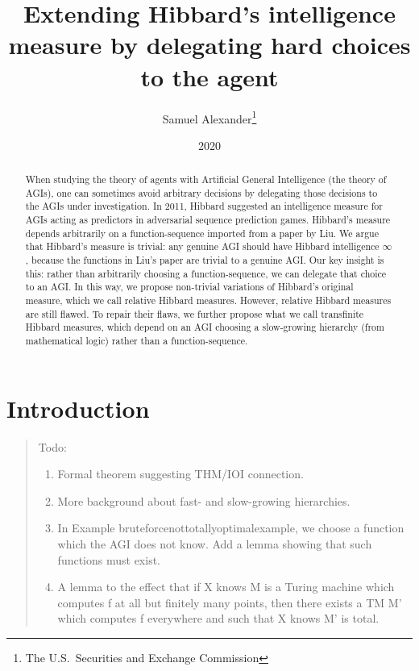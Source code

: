 \documentclass{article}
\title{Extending Hibbard's intelligence measure by delegating hard choices to the agent}
\author{Samuel Alexander\thanks{The U.S.\ Securities and Exchange Commission}}
\date{2020}
\begin{document}
\maketitle

\begin{abstract}
When studying the theory of agents with Artificial General Intelligence
(the theory of AGIs), one can sometimes avoid arbitrary decisions by
delegating those decisions to the AGIs under investigation.
In 2011, Hibbard suggested an intelligence measure for AGIs acting as
predictors in adversarial sequence prediction games. Hibbard's measure
depends arbitrarily on a function-sequence
imported from a paper by Liu. We argue that Hibbard's measure is trivial:
any genuine AGI should have Hibbard intelligence $\infty$,
because the functions in Liu's paper are
trivial to a genuine AGI. Our key insight is this: rather than
arbitrarily choosing a function-sequence, we can delegate that choice to an AGI.
In this way, we propose
non-trivial variations of Hibbard's original measure, which we call
relative Hibbard measures.
However, relative Hibbard measures are still flawed. To repair their flaws,
we further propose what we call transfinite Hibbard measures,
which depend on an AGI choosing a slow-growing hierarchy (from mathematical
logic) rather than a function-sequence.
\end{abstract}

\section{Introduction}

\begin{quote}
    Todo:
    \begin{enumerate}
        \item Formal theorem suggesting THM/IOI connection.
        \item More background about fast- and slow-growing hierarchies.
        \item In Example bruteforcenottotallyoptimalexample, we choose a function which
            the AGI does not know. Add a lemma showing that such functions must exist.
        \item A lemma to the effect that if X knows M is a Turing machine which computes
            f at all but finitely many points, then there exists a TM M' which computes
            f everywhere and such that X knows M' is total.
    \end{enumerate}
\end{quote}
\end{document}
